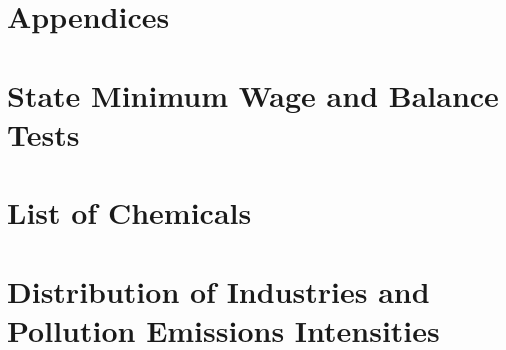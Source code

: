 \documentclass[12pt, english]{article}
\begin{document}
    \section*{Appendices}\label{sec:appendices}
    \begin{appendices}
        \renewcommand\thesection{\Roman{section}} %


        \section{State Minimum Wage and Balance Tests}\label{sec:state-minimum-wage-and-balance-tests}
        
        
%        
        
        


        \section{List of Chemicals}\label{sec:list-of-chemicals}
        


        \section{Distribution of Industries and Pollution Emissions Intensities}\label{sec:distribution-of-industries-and-pollution-emissions-intensities}
        
        
        
        
        
        
    \end{appendices}

\end{document}

